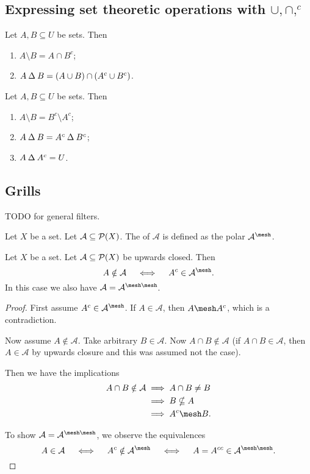 \subsection{Expressing set theoretic operations with $\cup,\cap, ^c$}
\begin{proposition}
Let $A,B\subseteq U$ be sets. Then
\begin{enumerate}
\item $A\setminus B = A \cap B^c$;
\item $A\mathbin{\Delta} B = (A\cup B)\cap (A^c\cup B^c)$.
\end{enumerate}
\end{proposition}
\begin{corollary}
Let $A,B \subseteq U$ be sets. Then
\begin{enumerate}
\item $A\setminus B = B^c\setminus A^c$;
\item $A \mathbin{\Delta} B = A^c \mathbin{\Delta} B^c$;
\item $A \mathbin{\Delta} A^c = U$.
\end{enumerate}
\end{corollary}

\subsection{Grills}
TODO for general filters.
\begin{definition}
Let $X$ be a set. Let $\mathcal{A} \subseteq \operatorname{\mathcal{P}}(X)$. The  of $\mathcal{A}$ is defined as the polar $\mathcal{A}^{\mesh}$.
\end{definition}

\begin{proposition} \label{complementInIsotoneGrill}
Let $X$ be a set. Let $\mathcal{A} \subseteq \operatorname{\mathcal{P}}(X)$ be upwards closed. Then
\[ A \notin \mathcal{A} \quad\iff\quad A^c \in \mathcal{A}^\mesh. \]
In this case we also have $\mathcal{A} = \mathcal{A}^{\mesh\mesh}$.
\end{proposition}
\begin{proof}
First assume $A^c \in \mathcal{A}^\mesh$. If $A\in\mathcal{A}$, then $A\mesh A^c$, which is a contradiction.

Now assume $A \notin \mathcal{A}$. Take arbitrary $B\in \mathcal{A}$. Now $A\cap B\notin \mathcal{A}$ (if $A\cap B\in \mathcal{A}$, then $A\in \mathcal{A}$ by upwards closure and this was assumed not the case).

Then we have the implications
\begin{align*}
A\cap B\notin \mathcal{A} &\implies A\cap B \neq B \\
&\implies B\nsubseteq A \\
&\implies A^c \mesh B.
\end{align*}

To show $\mathcal{A} = \mathcal{A}^{\mesh\mesh}$, we observe the equivalences
\[ A\in\mathcal{A} \quad\iff\quad A^c \notin \mathcal{A}^\mesh \quad\iff\quad A = A^{cc} \in \mathcal{A}^{\mesh\mesh}. \]
\end{proof}

